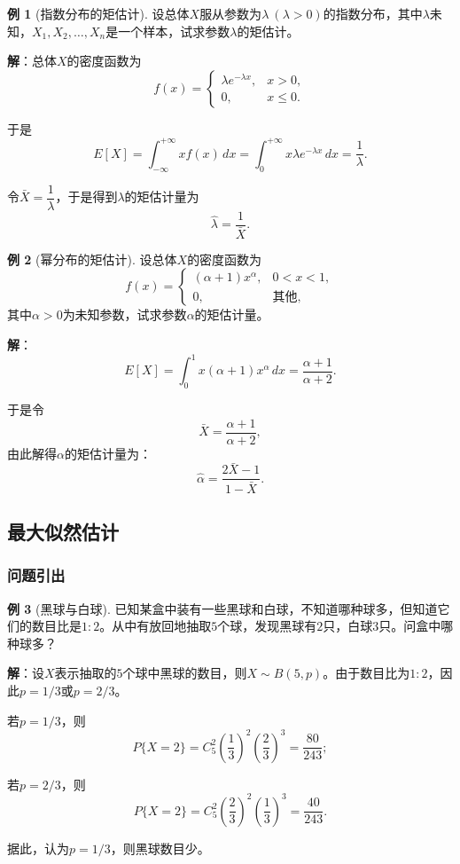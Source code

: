 \documentclass[11pt,a4paper]{report}
\theoremstyle{definition}
\newtheorem{example}{例}[chapter]
\begin{document}
\begin{example}[指数分布的矩估计]
设总体$X$服从参数为$\lambda\ (\lambda>0)$的指数分布，其中$\lambda$未知，$X_{1},X_{2},\ldots,X_{n}$是一个样本，试求参数$\lambda$的矩估计。

\textbf{解}：总体$X$的密度函数为
\[
f(x)=
\begin{cases}
\lambda e^{-\lambda x}, & x>0,\\[0.3em]
0, & x\leq 0.
\end{cases}
\]

于是
\[
E[X]=\int_{-\infty}^{+\infty}x f(x)\,dx=\int_{0}^{+\infty}x\lambda e^{-\lambda x}\,dx=\frac{1}{\lambda}.
\]

令$\bar{X}=\dfrac{1}{\lambda}$，于是得到$\lambda$的矩估计量为
\[
\hat{\lambda}=\frac{1}{\bar{X}}.
\]
\end{example}

\begin{example}[幂分布的矩估计]
设总体$X$的密度函数为
\[
f(x)=
\begin{cases}
(\alpha+1)x^{\alpha}, & 0<x<1,\\[0.3em]
0, & \text{其他},
\end{cases}
\]
其中$\alpha>0$为未知参数，试求参数$\alpha$的矩估计量。

\textbf{解}：
\[
E[X]=\int_{0}^{1}x(\alpha+1)x^{\alpha}\,dx=\frac{\alpha+1}{\alpha+2}.
\]

于是令
\[
\bar{X}=\frac{\alpha+1}{\alpha+2},
\]
由此解得$\alpha$的矩估计量为：
\[
\hat{\alpha}=\frac{2\bar{X}-1}{1-\bar{X}}.
\]
\end{example}

\subsection{最大似然估计}

\subsubsection*{问题引出}

\begin{example}[黑球与白球]
已知某盒中装有一些黑球和白球，不知道哪种球多，但知道它们的数目比是$1:2$。从中有放回地抽取$5$个球，发现黑球有$2$只，白球$3$只。问盒中哪种球多？

\textbf{解}：设$X$表示抽取的$5$个球中黑球的数目，则$X\sim B(5,p)$。由于数目比为$1:2$，因此$p=1/3$或$p=2/3$。

若$p=1/3$，则
\[
P\{X=2\}=C_{5}^{2}\left(\frac{1}{3}\right)^{2}\left(\frac{2}{3}\right)^{3}=\frac{80}{243};
\]

若$p=2/3$，则
\[
P\{X=2\}=C_{5}^{2}\left(\frac{2}{3}\right)^{2}\left(\frac{1}{3}\right)^{3}=\frac{40}{243}.
\]

据此，认为$p=1/3$，则黑球数目少。
\end{example}
\end{document}
